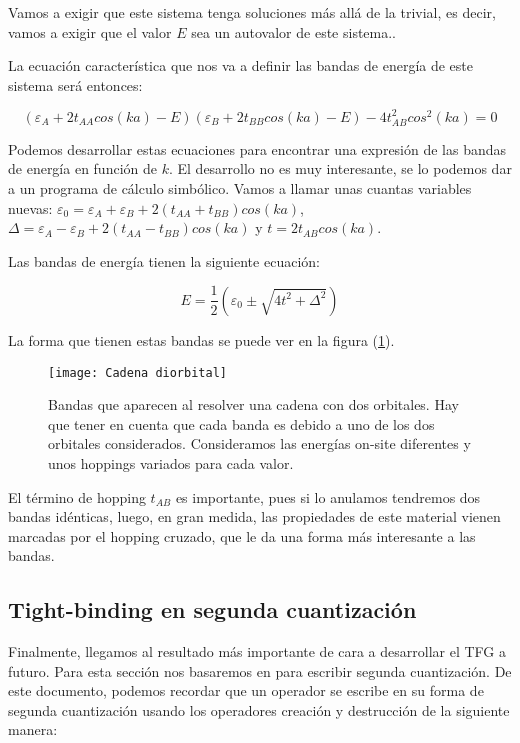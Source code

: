 \documentclass{article} %
\begin{document}
Vamos a exigir que este sistema tenga soluciones más allá de la trivial, es decir, vamos a exigir que el valor $E$ sea un autovalor de este sistema..

La ecuación característica que nos va a definir las bandas de energía de este sistema será entonces:

$$
\left(\varepsilon_A + 2t_{AA}cos(ka) - E\right)\left(\varepsilon_B + 2t_{BB}cos(ka)-E\right)-4t_{AB}^2cos^2(ka) = 0
$$

Podemos desarrollar estas ecuaciones para encontrar una expresión de las bandas de energía en función de $k$. El desarrollo no es muy interesante, se lo podemos dar a un programa de cálculo simbólico. Vamos a llamar unas cuantas variables nuevas: $\varepsilon_0 = \varepsilon_A + \varepsilon_B + 2(t_{AA} + t_{BB})cos(ka)$, $\Delta = \varepsilon_A - \varepsilon_B + 2(t_{AA} - t_{BB})cos(ka)$ y $t=2t_{AB}cos(ka)$.

Las bandas de energía tienen la siguiente ecuación:

\begin{equation}
E = \frac{1}{2}\left(\varepsilon_0 \pm \sqrt{4t^2 + \Delta^2}\right)
\label{eq:dosOrbs}
\end{equation}

La forma que tienen estas bandas se puede ver en la figura (\ref{fig:bandasDiorb}).

\begin{figure}[h!]
\begin{center}
\texttt{[image: Cadena diorbital]}
\caption{Bandas que aparecen al resolver una cadena con dos orbitales. Hay que tener en cuenta que cada banda es debido a uno de los dos orbitales considerados. Consideramos las energías on-site diferentes y unos hoppings variados para cada valor.}
\label{fig:bandasDiorb}
\end{center}
\end{figure}

El término de hopping $t_{AB}$ es importante, pues si lo anulamos tendremos dos bandas idénticas, luego, en gran medida, las propiedades de este material vienen marcadas por el hopping cruzado, que le da una forma más interesante a las bandas.

\subsection{Tight-binding en segunda cuantización}

Finalmente, llegamos al resultado más importante de cara a desarrollar el TFG a futuro. Para esta sección nos basaremos en \cite{LuisAVQ} para escribir segunda cuantización. De este documento, podemos recordar que un operador se escribe en su forma de segunda cuantización usando los operadores creación y destrucción de la siguiente manera:
\end{document}
